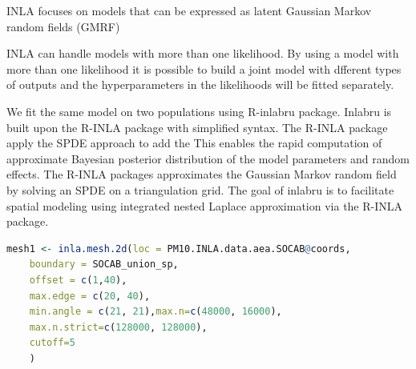 INLA focuses on models that can be expressed as latent Gaussian Markov random ﬁelds (GMRF)

INLA can handle models with more than one likelihood. By using a model with more than one likelihood it is possible to build a joint model with dfferent types of outputs and the hyperparameters in the likelihoods will be ﬁtted separately.

We fit the same model on two populations using R-inlabru package. Inlabru is built upon the R-INLA 
package with simplified syntax. The R-INLA package apply the SPDE approach to add the
This enables the rapid computation of approximate Bayesian posterior distribution of the model 
parameters and random effects. The R-INLA packages approximates the Gaussian Markov random field by
solving an SPDE on a triangulation grid.
The goal of inlabru is to facilitate spatial modeling using integrated nested Laplace approximation via the R-INLA package.

\begin{lstlisting}[language = R]
	mesh1 <- inla.mesh.2d(loc = PM10.INLA.data.aea.SOCAB@coords, 
	boundary = SOCAB_union_sp,
	offset = c(1,40),
	max.edge = c(20, 40),
	min.angle = c(21, 21),max.n=c(48000, 16000), 
	max.n.strict=c(128000, 128000), 
	cutoff=5
	) 
\end{lstlisting} \label{code:inlaMesh}
